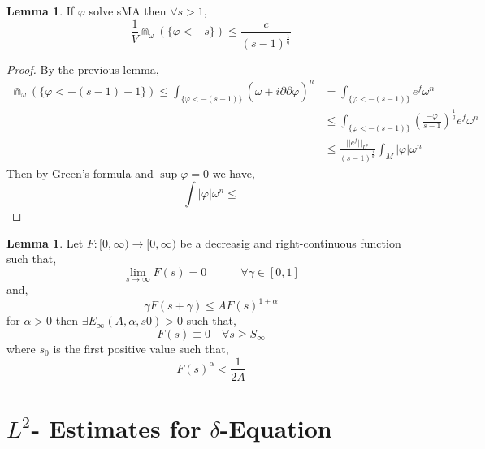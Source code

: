 \documentclass[12pt]{extarticle}
\theoremstyle{definition}
\newtheorem{lemma}[theorem]{Lemma}
\begin{document}
\begin{lemma}
If $\varphi$ solve sMA then $\forall s > 1$,
\[ \frac{1}{V} \Cap_\omega\left( \{ \varphi < - s \} \right) \le \frac{c}{(s - 1)^{\frac{1}{q}}} \]
\end{lemma}

\begin{proof}
By the previous lemma,
\begin{align*}
 \Cap_{\omega}\left( \{ \varphi < - (s-1) - 1 \} \right) \le \int_{\{ \varphi < -(s-1) \}} (\omega + i \partial \bar{\partial} \varphi)^n & = \int_{\{ \varphi < - (s-1) \}} e^f \omega^n 
 \\
 & \le \int_{\{ \varphi < - (s-1) \}} \left( \frac{-\varphi}{s-1} \right)^{\frac{1}{q}} e^f \omega^n 
\\
& \le \frac{||e^f||_{L^p}}{(s - 1)^{\frac{1}{q}}} \int_M |\varphi| \omega^n 
\end{align*}
Then by Green's formula and $\sup{\varphi} = 0$ we have,
\[ \int |\varphi| \omega^n \le  \]
\end{proof}

\begin{lemma}
Let $F : [0, \infty) \to [0, \infty)$ be a decreasig and right-continuous function such that,
\[ \lim_{s \to \infty} F(s) = 0 \quad \quad \quad \forall \gamma \in [0, 1] \]
and,
\[ \gamma F(s + \gamma) \le A F(s)^{1 + \alpha} \]
for $\alpha > 0$ then $\exists E_\infty(A, \alpha, s0) > 0$ such that,
\[ F(s) \equiv 0 \quad \forall s \ge S_\infty \]
where $s_0$ is the first positive value such that,
\[ F(s)^\alpha < \frac{1}{2 A} \]
\end{lemma}

\section{$L^2$- Estimates for $\delta$-Equation}
\end{document}
